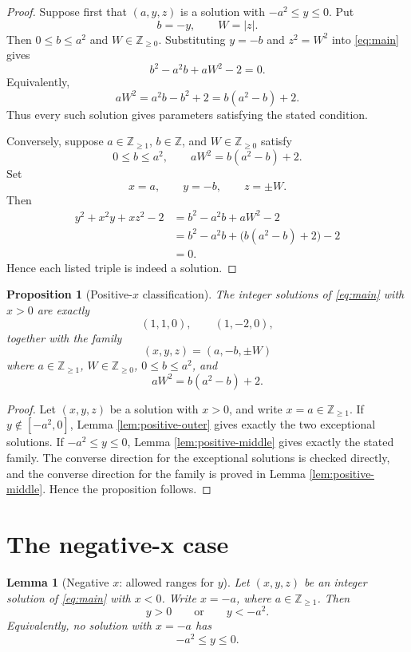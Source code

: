 \documentclass[11pt]{article}
\newtheorem{lemma}[theorem]{Lemma}
\newtheorem{proposition}[theorem]{Proposition}
\theoremstyle{remark}
\newcommand{\Z}{\mathbb Z}
\newcommand{\Zge}{\mathbb Z_{\ge 0}}
\newcommand{\Zpos}{\mathbb Z_{\ge 1}}
\begin{document}
\begin{proof}
Suppose first that $(a,y,z)$ is a solution with $-a^2\le y\le 0$.  Put
\[
        b=-y,
        \qquad W=|z|.
\]
Then $0\le b\le a^2$ and $W\in\Zge$.  Substituting $y=-b$ and $z^2=W^2$ into \eqref{eq:main} gives
\[
        b^2-a^2b+aW^2-2=0.
\]
Equivalently,
\[
        aW^2=a^2b-b^2+2=b(a^2-b)+2.
\]
Thus every such solution gives parameters satisfying the stated condition.

Conversely, suppose $a\in\Zpos$, $b\in\Z$, and $W\in\Zge$ satisfy
\[
        0\le b\le a^2,
        \qquad aW^2=b(a^2-b)+2.
\]
Set
\[
        x=a,
        \qquad y=-b,
        \qquad z=\pm W.
\]
Then
\[
\begin{aligned}
        y^2+x^2y+xz^2-2
        &=b^2-a^2b+aW^2-2 \\
        &=b^2-a^2b+\bigl(b(a^2-b)+2\bigr)-2 \\
        &=0.
\end{aligned}
\]
Hence each listed triple is indeed a solution.
\end{proof}

\begin{proposition}[Positive-$x$ classification]\label{prop:positive-classification}
The integer solutions of \eqref{eq:main} with $x>0$ are exactly
\[
        (1,1,0),\qquad (1,-2,0),
\]
together with the family
\[
        (x,y,z)=(a,-b,\pm W)
\]
where $a\in\Zpos$, $W\in\Zge$, $0\le b\le a^2$, and
\[
        aW^2=b(a^2-b)+2.
\]
\end{proposition}

\begin{proof}
Let $(x,y,z)$ be a solution with $x>0$, and write $x=a\in\Zpos$.  If $y\notin[-a^2,0]$, Lemma \ref{lem:positive-outer} gives exactly the two exceptional solutions.  If $-a^2\le y\le 0$, Lemma \ref{lem:positive-middle} gives exactly the stated family.  The converse direction for the exceptional solutions is checked directly, and the converse direction for the family is proved in Lemma \ref{lem:positive-middle}.  Hence the proposition follows.
\end{proof}

\section{The negative-x case}

\begin{lemma}[Negative $x$: allowed ranges for $y$]\label{lem:negative-ranges}
Let $(x,y,z)$ be an integer solution of \eqref{eq:main} with $x<0$.  Write $x=-a$, where $a\in\Zpos$.  Then
\[
        y>0
        \qquad\text{or}\qquad
        y<-a^2.
\]
Equivalently, no solution with $x=-a$ has
\[
        -a^2\le y\le 0.
\]
\end{lemma}
\end{document}
